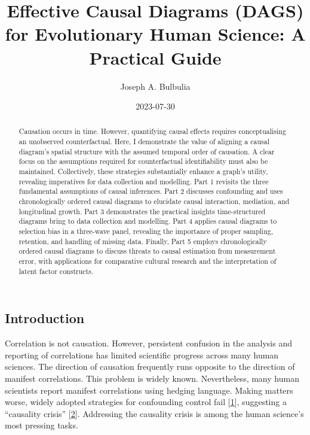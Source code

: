\documentclass[
  singlecolumn]{article}
\title{Effective Causal Diagrams (DAGS) for Evolutionary Human Science:
A Practical Guide}
\author{Joseph A. Bulbulia}
\affil{%
                  Victoria University of Wellington, New Zealand, School
                  of Psychology, Centre for Applied Cross-Cultural
                  Research
              }
\date{2023-07-30}
\begin{document}
\maketitle
\begin{abstract}
Causation occurs in time. However, quantifying causal effects requires
conceptualising an unobserved counterfactual. Here, I demonstrate the
value of aligning a causal diagram's spatial structure with the assumed
temporal order of causation. A clear focus on the assumptions required
for counterfactual identifiability must also be maintained.
Collectively, these strategies substantially enhance a graph's utility,
revealing imperatives for data collection and modelling. Part 1 revisits
the three fundamental assumptions of causal inferences. Part 2 discusses
confounding and uses chronologically ordered causal diagrams to
elucidate causal interaction, mediation, and longitudinal growth. Part 3
demonstrates the practical insights time-structured diagrams bring to
data collection and modelling. Part 4 applies causal diagrams to
selection bias in a three-wave panel, revealing the importance of proper
sampling, retention, and handling of missing data. Finally, Part 5
employs chronologically ordered causal diagrams to discuss threats to
causal estimation from measurement error, with applications for
comparative cultural research and the interpretation of latent factor
constructs.
\end{abstract}
\ifdefined\Shaded\renewenvironment{Shaded}{\begin{tcolorbox}[borderline west={3pt}{0pt}{shadecolor}, interior hidden, sharp corners, frame hidden, boxrule=0pt, enhanced, breakable]}{\end{tcolorbox}}\fi

\hypertarget{introduction}{%
\subsection{Introduction}\label{introduction}}

Correlation is not causation. However, persistent confusion in the
analysis and reporting of correlations has limited scientific progress
across many human sciences. The direction of causation frequently runs
opposite to the direction of manifest correlations. This problem is
widely known. Nevertheless, many human scientists report manifest
correlations using hedging language. Making matters worse, widely
adopted strategies for confounding control fail
{[}\protect\hyperlink{ref-mcelreath2020}{1}{]}, suggesting a ``causality
crisis'' {[}\protect\hyperlink{ref-bulbulia2022}{2}{]}. Addressing the
causality crisis is among the human science's most pressing tasks.
\end{document}
